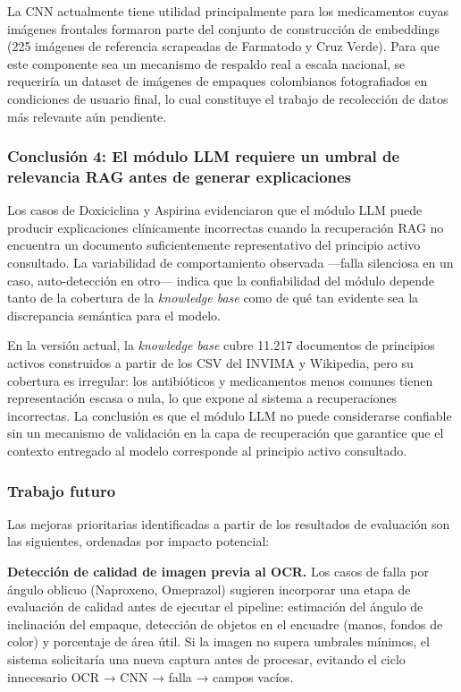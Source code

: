 La CNN actualmente tiene utilidad principalmente para los medicamentos cuyas imágenes frontales formaron parte del conjunto de construcción de embeddings (225 imágenes de referencia scrapeadas de Farmatodo y Cruz Verde). Para que este componente sea un mecanismo de respaldo real a escala nacional, se requeriría un dataset de imágenes de empaques colombianos fotografiados en condiciones de usuario final, lo cual constituye el trabajo de recolección de datos más relevante aún pendiente.

\subsubsection*{Conclusión 4: El módulo LLM requiere un umbral de relevancia RAG antes de generar explicaciones}

Los casos de Doxiciclina y Aspirina evidenciaron que el módulo LLM puede producir explicaciones clínicamente incorrectas cuando la recuperación RAG no encuentra un documento suficientemente representativo del principio activo consultado. La variabilidad de comportamiento observada ---falla silenciosa en un caso, auto-detección en otro--- indica que la confiabilidad del módulo depende tanto de la cobertura de la \textit{knowledge base} como de qué tan evidente sea la discrepancia semántica para el modelo.

En la versión actual, la \textit{knowledge base} cubre 11.217 documentos de principios activos construidos a partir de los CSV del INVIMA y Wikipedia, pero su cobertura es irregular: los antibióticos y medicamentos menos comunes tienen representación escasa o nula, lo que expone al sistema a recuperaciones incorrectas. La conclusión es que el módulo LLM no puede considerarse confiable sin un mecanismo de validación en la capa de recuperación que garantice que el contexto entregado al modelo corresponde al principio activo consultado.

\subsubsection*{Trabajo futuro}

Las mejoras prioritarias identificadas a partir de los resultados de evaluación son las siguientes, ordenadas por impacto potencial:

\textbf{Detección de calidad de imagen previa al OCR.} Los casos de falla por ángulo oblicuo (Naproxeno, Omeprazol) sugieren incorporar una etapa de evaluación de calidad antes de ejecutar el pipeline: estimación del ángulo de inclinación del empaque, detección de objetos en el encuadre (manos, fondos de color) y porcentaje de área útil. Si la imagen no supera umbrales mínimos, el sistema solicitaría una nueva captura antes de procesar, evitando el ciclo innecesario OCR → CNN → falla → campos vacíos.

